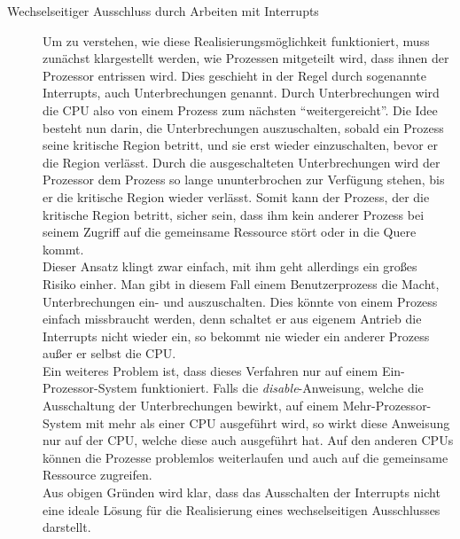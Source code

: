 				\begin{description}
					\item[Wechselseitiger Ausschluss durch Arbeiten mit Interrupts]
					
							Um zu verstehen, wie diese Realisierungsmöglichkeit funktioniert, muss zunächst klargestellt werden, wie Prozessen mitgeteilt wird, dass ihnen der Prozessor entrissen wird. Dies geschieht in der Regel durch sogenannte Interrupts, auch Unterbrechungen genannt. Durch Unterbrechungen wird die CPU also von einem Prozess zum nächsten "`weitergereicht"'. Die Idee besteht nun darin, die Unterbrechungen auszuschalten, sobald ein Prozess seine kritische Region betritt, und sie erst wieder einzuschalten, bevor er die Region verlässt. Durch die ausgeschalteten Unterbrechungen wird der Prozessor dem Prozess so lange ununterbrochen zur Verfügung stehen, bis er die kritische Region wieder verlässt. Somit kann der Prozess, der die kritische Region betritt, sicher sein, dass ihm kein anderer Prozess bei seinem Zugriff auf die gemeinsame Ressource stört oder in die Quere kommt.\\
							Dieser Ansatz klingt zwar einfach, mit ihm geht allerdings ein großes Risiko einher. Man gibt in diesem Fall einem Benutzerprozess die Macht, Unterbrechungen ein- und auszuschalten. Dies könnte von einem Prozess einfach missbraucht werden, denn schaltet er aus eigenem Antrieb die Interrupts nicht wieder ein, so bekommt nie wieder ein anderer Prozess außer er selbst die CPU.\\
							Ein weiteres Problem ist, dass dieses Verfahren nur auf einem Ein-Prozessor-System funktioniert. Falls die \textit{disable}-Anweisung, welche die Ausschaltung der Unterbrechungen bewirkt, auf einem Mehr-Prozessor-System mit mehr als einer CPU ausgeführt wird, so wirkt diese Anweisung nur auf der CPU, welche diese auch ausgeführt hat. Auf den anderen CPUs können die Prozesse problemlos weiterlaufen und auch auf die gemeinsame Ressource zugreifen.\\
							Aus obigen Gründen wird klar, dass das Ausschalten der Interrupts nicht eine ideale Lösung für die Realisierung eines wechselseitigen Ausschlusses darstellt. \cite{ModerneBetriebssysteme}

					\item[{\parbox[t]{1.2\linewidth}{Wechselseitiger Ausschluss unter Verwendung von aktivem \\Warten}}] %
					

\end{description}
